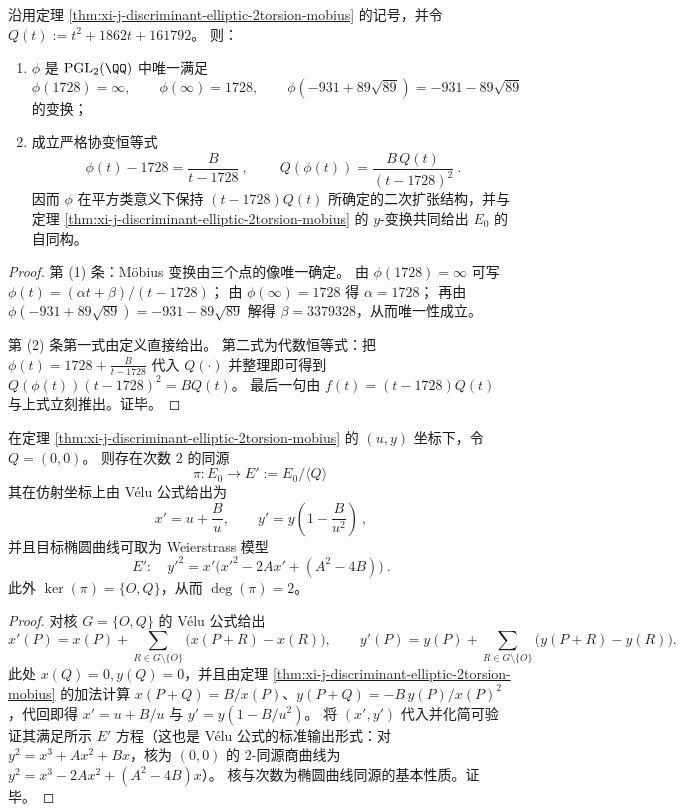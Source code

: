 \begin{proposition}\label{prop:xi-j-discriminant-mobius-rigidity-covariance}
沿用定理 \ref{thm:xi-j-discriminant-elliptic-2torsion-mobius} 的记号，并令
\(
Q(t):=t^2+1862t+161792
\)。
则：
\begin{enumerate}
  \item \(\phi\) 是 \(\mathrm{PGL}_2(\QQ)\) 中唯一满足
  \[
  \phi(1728)=\infty,\qquad \phi(\infty)=1728,\qquad
  \phi(-931+89\sqrt{89})=-931-89\sqrt{89}
  \]
  的变换；
  \item 成立严格协变恒等式
  \[
  \boxed{\ \phi(t)-1728=\frac{B}{t-1728}\ },
  \qquad
  \boxed{\ Q(\phi(t))=\frac{B\,Q(t)}{(t-1728)^2}\ }.
  \]
  因而 \(\phi\) 在平方类意义下保持 \((t-1728)Q(t)\) 所确定的二次扩张结构，并与定理 \ref{thm:xi-j-discriminant-elliptic-2torsion-mobius} 的 \(y\)-变换共同给出 \(E_0\) 的自同构。
\end{enumerate}
\end{proposition}
\begin{proof}
第 (1) 条：Möbius 变换由三个点的像唯一确定。
由 \(\phi(1728)=\infty\) 可写 \(\phi(t)=(\alpha t+\beta)/(t-1728)\)；
由 \(\phi(\infty)=1728\) 得 \(\alpha=1728\)；
再由 \(\phi(-931+89\sqrt{89})=-931-89\sqrt{89}\) 解得 \(\beta=3379328\)，从而唯一性成立。
\par
第 (2) 条第一式由定义直接给出。
第二式为代数恒等式：把 \(\phi(t)=1728+\frac{B}{t-1728}\) 代入 \(Q(\cdot)\) 并整理即可得到
\(
Q(\phi(t))(t-1728)^2=BQ(t)
\)。
最后一句由 \(f(t)=(t-1728)Q(t)\) 与上式立刻推出。证毕。
\end{proof}

\begin{theorem}\label{thm:xi-j-discriminant-2isogeny-velu}
在定理 \ref{thm:xi-j-discriminant-elliptic-2torsion-mobius} 的 \((u,y)\) 坐标下，令 \(Q=(0,0)\)。
则存在次数 \(2\) 的同源
\[
\pi:E_0\longrightarrow E':=E_0/\langle Q\rangle
\]
其在仿射坐标上由 Vélu 公式给出为
\[
\boxed{\ x'=u+\frac{B}{u},\qquad y'=y\left(1-\frac{B}{u^2}\right)\ },
\]
并且目标椭圆曲线可取为 Weierstrass 模型
\[
\boxed{\ E':\quad y'^2=x'\bigl(x'^2-2Ax'+(A^2-4B)\bigr)\ }.
\]
此外 \(\ker(\pi)=\{O,Q\}\)，从而 \(\deg(\pi)=2\)。
\end{theorem}
\begin{proof}
对核 \(G=\{O,Q\}\) 的 Vélu 公式给出
\[
x'(P)=x(P)+\sum_{R\in G\setminus\{O\}}\bigl(x(P+R)-x(R)\bigr),\qquad
y'(P)=y(P)+\sum_{R\in G\setminus\{O\}}\bigl(y(P+R)-y(R)\bigr).
\]
此处 \(x(Q)=0,y(Q)=0\)，并且由定理 \ref{thm:xi-j-discriminant-elliptic-2torsion-mobius} 的加法计算 \(x(P+Q)=B/x(P)\)、\(y(P+Q)=-B\,y(P)/x(P)^2\)，代回即得
\(
x'=u+B/u
\)
与
\(
y'=y(1-B/u^2)
\)。
将 \((x',y')\) 代入并化简可验证其满足所示 \(E'\) 方程（这也是 Vélu 公式的标准输出形式：对 \(y^2=x^3+Ax^2+Bx\)，核为 \((0,0)\) 的 \(2\)-同源商曲线为 \(y^2=x^3-2Ax^2+(A^2-4B)x\)）。
核与次数为椭圆曲线同源的基本性质。证毕。
\end{proof}

